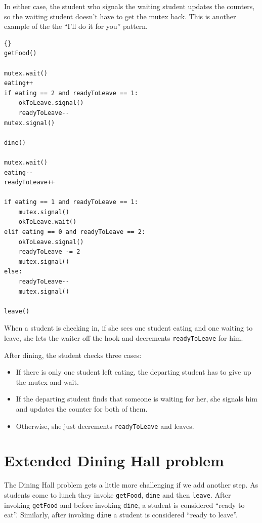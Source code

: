 \documentclass{book}
\begin{document}
In either case, the student who signals the waiting student
updates the counters, so the waiting student doesn't have
to get the mutex back.  This is another example of the
the ``I'll do it for you'' pattern.

\begin{lstlisting}[title={Dining Hall problem solution}]{}
getFood()

mutex.wait()
eating++
if eating == 2 and readyToLeave == 1:
    okToLeave.signal()
    readyToLeave--
mutex.signal()

dine()

mutex.wait()
eating--
readyToLeave++

if eating == 1 and readyToLeave == 1:
    mutex.signal()
    okToLeave.wait()
elif eating == 0 and readyToLeave == 2:
    okToLeave.signal()
    readyToLeave -= 2
    mutex.signal()
else:
    readyToLeave--
    mutex.signal()

leave()
\end{lstlisting}

When a student is checking in, if she sees one student
eating and one waiting to leave, she lets the waiter off the
hook and decrements {\tt readyToLeave} for him.

\newpage
After dining, the student checks three cases:

\begin{itemize}

\item If there is only one student left eating, the departing student
has to give up the mutex and wait.

\item If the departing student finds that someone is waiting for
her, she signals him and updates the counter for both of them.

\item Otherwise, she just decrements {\tt readyToLeave} and leaves.

\end{itemize}


\section{Extended Dining Hall problem}

The Dining Hall problem gets a little more challenging if we
add another step.  As students come to lunch they
invoke {\tt getFood}, {\tt dine} and then {\tt leave}.
After invoking {\tt getFood} and before invoking {\tt dine},
a student is considered ``ready to eat''.  Similarly, after
invoking {\tt dine} a student is considered ``ready to leave''.
\end{document}
